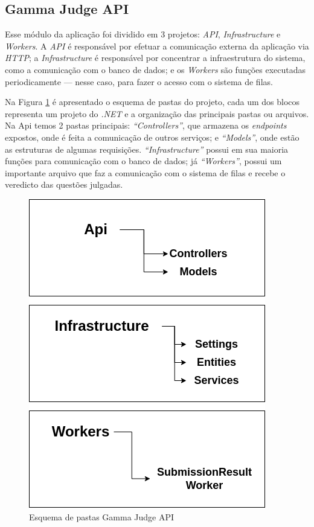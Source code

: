 \subsection{Gamma Judge API}
\label{sec:gammaJudgeApi}

Esse módulo da aplicação foi dividido em 3 projetos: \textit{API}, \textit{Infrastructure} e \textit{Workers}. A \textit{API} é responsável por efetuar a comunicação externa da aplicação via \textit{HTTP}; a \textit{Infrastructure} é responsável por concentrar a infraestrutura do sistema, como a comunicação com o banco de dados; e os \textit{Workers} são funções executadas periodicamente — nesse caso, para fazer o acesso com o sistema de filas.

Na Figura \ref{fig:judge_ui_folders} é apresentado o esquema de pastas do projeto, cada um dos blocos representa um projeto do \textit{.NET} e a organização das principais pastas ou arquivos. Na Api temos 2 pastas principais: \textit{“Controllers”}, que armazena os \textit{endpoints} expostos, onde é feita a comunicação de outros serviços; e \textit{“Models”}, onde estão as estruturas de algumas requisições. \textit{“Infrastructure”} possui em sua maioria funções para comunicação com o banco de dados; já  \textit{“Workers”}, possui um importante arquivo que faz a comunicação com o sistema de filas e recebe o veredicto das questões julgadas.

\begin{figure}[H]
    \centering
    \includegraphics[keepaspectratio=true,scale=0.5]{figuras/gamma_judge_api_folders.png}
    \caption{Esquema de pastas Gamma Judge API}
    \label{fig:judge_ui_folders}
\end{figure}

